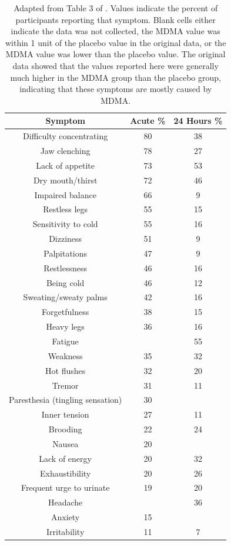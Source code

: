 \documentclass[12pt,letterpaper]{book}
\begin{document}
\begin{table}[htbp]
    \centering
    \caption{Adapted from Table 3 of \textcite{liechtiGender}. Values indicate the percent of participants reporting that symptom. Blank cells either indicate the data was not collected, the MDMA value was within 1 unit of the placebo value in the original data, or the MDMA value was lower than the placebo value. The original data showed that the values reported here were generally much higher in the MDMA group than the placebo group, indicating that these symptoms are mostly caused by MDMA.}
    \label{table:sideeffects}
    \begin{tabular}{|c|c|c|}
    \hline
    \textbf{Symptom} & \textbf{Acute \%} & \textbf{24 Hours \%} \\ \hline
        Difficulty concentrating & 80 & 38 \\
        Jaw clenching            & 78 & 27 \\
        Lack of appetite         & 73 & 53 \\
        Dry mouth/thirst         & 72 & 46 \\
        Impaired balance         & 66 & 9  \\
        Restless legs            & 55 & 15 \\
        Sensitivity to cold      & 55 & 16 \\
        Dizziness                & 51 & 9  \\
        Palpitations             & 47 & 9  \\
        Restlessness             & 46 & 16 \\
        Being cold               & 46 & 12 \\
        Sweating/sweaty palms    & 42 & 16 \\
        Forgetfulness            & 38 & 15 \\
        Heavy legs               & 36 & 16 \\
        Fatigue                  &    & 55 \\
        Weakness                 & 35 & 32 \\
        Hot flushes              & 32 & 20 \\
        Tremor                   & 31 & 11 \\
        Paresthesia (tingling sensation)              & 30 &    \\
        Inner tension            & 27 & 11 \\
        Brooding                 & 22 & 24 \\
        Nausea                   & 20 &    \\
        Lack of energy           & 20 & 32 \\
        Exhaustibility           & 20 & 26 \\
        Frequent urge to urinate & 19 & 20 \\
        Headache                 &    & 36 \\
        Anxiety                  & 15 &    \\
        Irritability             & 11 & 7  \\
        \hline
    \end{tabular}
\end{table}
\end{document}
